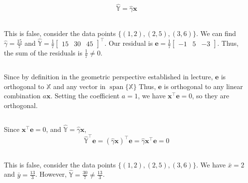 \documentclass{article}
\newcommand{\X}{\mathbb{X}}
\newcommand{\Y}{\mathbb{Y}}
\DeclareMathOperator{\Span}{span}
\begin{document}
\section{}

\begin{gather}
    \hat{\Y} = \hat{\gamma} \bm{x}
\end{gather}

\subsection{}

This is false, consider the data points \(\{(1, 2), (2, 5), (3, 6)\}\).
We can find \(\hat{\gamma} = \frac{15}{7}\) and \(\hat{\Y} = \frac{1}{7}
\begin{bmatrix}
    15 & 30 & 45
\end{bmatrix}^\top\).
Our residual is \(\bm{e} = \frac{1}{7}
\begin{bmatrix}
    -1 & 5 & -3
\end{bmatrix}\).
Thus, the sum of the residuals is \(\frac{1}{7} \neq 0\).

\subsection{}

Since by definition in the geometric perspective established in lecture, \(\bm{e}\) is orthogonal to \(\X\) and any vector in \(\Span\{\X\}\)
Thus, \(\bm{e}\) is orthogonal to any linear combination \(a\bm{x}\).
Setting the coefficient \(a = 1\), we have \(\bm{x}^\top \bm{e} = 0\), so they are orthogonal.

\subsection{}

Since \(\bm{x}^\top \bm{e} = 0\), and \(\hat{\Y} = \hat{\gamma} \bm{x}\),
\begin{equation}
    \hat{\Y}^\top \bm{e} = (\hat{\gamma} \bm{x})^\top \bm{e} = \hat{\gamma} \bm{x}^\top \bm{e} = 0
\end{equation}

\subsection{}

This is false, consider the data points \(\{(1, 2), (2, 5), (3, 6)\}\).
We have \(\bar{x} = 2\) and \(\bar{y} = \frac{13}{3}\).
However, \(\hat{\Y} = \frac{30}{7} \neq \frac{13}{3}\).
\end{document}
